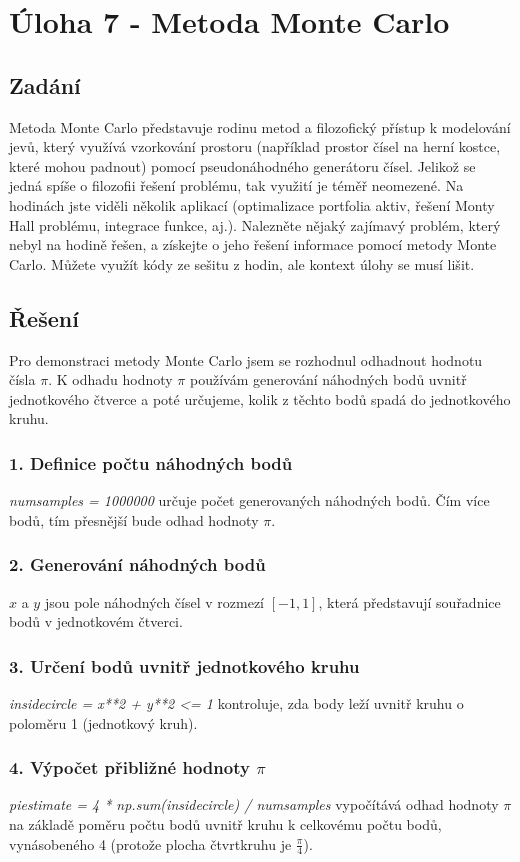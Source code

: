 \documentclass[a4paper,12pt]{article}
\begin{document}
	\section {Úloha 7 - Metoda Monte Carlo}
	\subsection{Zadání}
Metoda Monte Carlo představuje rodinu metod a filozofický přístup k modelování jevů, který využívá vzorkování prostoru (například prostor čísel na herní kostce, které mohou padnout) pomocí pseudonáhodného generátoru čísel. Jelikož se jedná spíše o filozofii řešení problému, tak využití je téměř neomezené. Na hodinách jste viděli několik aplikací (optimalizace portfolia aktiv, řešení Monty Hall problému, integrace funkce, aj.). Nalezněte nějaký zajímavý problém, který nebyl na hodině řešen, a získejte o jeho řešení informace pomocí metody Monte Carlo. Můžete využít kódy ze sešitu z hodin, ale kontext úlohy se musí lišit. 

\subsection{Řešení}
Pro demonstraci metody Monte Carlo jsem se rozhodnul odhadnout hodnotu čísla $\pi$. K odhadu hodnoty $\pi$ používám generování náhodných bodů uvnitř jednotkového čtverce a poté určujeme, kolik z těchto bodů spadá do jednotkového kruhu.
\subsubsection{1. Definice počtu náhodných bodů}
\textit{num{\textunderscore}samples = 1000000} určuje počet generovaných náhodných bodů. Čím více bodů, tím přesnější bude odhad hodnoty $\pi$.
\subsubsection{2. Generování náhodných bodů}
$x$ a $y$ jsou pole náhodných čísel v rozmezí $[-1, 1]$, která představují souřadnice bodů v jednotkovém čtverci.
\subsubsection{3. Určení bodů uvnitř jednotkového kruhu}
\textit{inside{\textunderscore}circle = x**2 + y**2 <= 1} kontroluje, zda body leží uvnitř kruhu o poloměru 1 (jednotkový kruh).
\subsubsection{4. Výpočet přibližné hodnoty $\pi$}
\textit{pi{\textunderscore}estimate = 4 * np.sum(inside{\textunderscore}circle) / num{\textunderscore}samples} vypočítává odhad hodnoty $\pi$ na základě poměru počtu bodů uvnitř kruhu k celkovému počtu bodů, vynásobeného 4 (protože plocha čtvrtkruhu je $\frac{\pi}{4}$).

	
\end{document}
